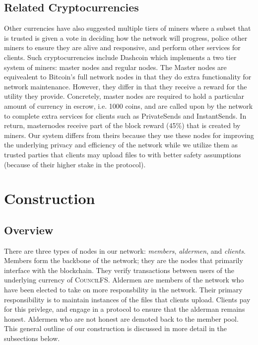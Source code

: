 \documentclass{article}
\begin{document}
\subsection{Related Cryptocurrencies}
Other currencies have also suggested multiple tiers of miners where a subset that is trusted is given a vote in deciding how the network will progress, police other miners to ensure they are alive and responsive, and perform other services for clients. Such cryptocurrencies include Dashcoin which implements a two tier system of miners: master nodes and regular nodes. The Master nodes are equivealent to Bitcoin's full network nodes in that they do extra functionality for network maintenance. However, they differ in that they receive a reward for the utility they provide. Concretely, master nodes are required to hold a particular amount of currency in escrow, i.e. 1000 coins, and are called upon by the network to complete extra services for clients such as PrivateSends and InstantSends. In return, masternodes receive part of the block reward (45\%) that is created by miners. Our system differs from theirs because they use these nodes for improving the underlying privacy and efficiency of the network while we utilize them as trusted parties that clients may upload files to with better safety assumptions (because of their higher stake in the protocol).   

\section{Construction}

\subsection{Overview}

There are three types of nodes in our network: \emph{members}, \emph{aldermen},
and \emph{clients}. Members form the backbone of the network; they are the nodes
that primarily interface with the blockchain. They verify transactions between
users of the underlying currency of \textsc{CouncilFS}. Aldermen are members of the
network who have been elected to take on more responsbility in the network.
Their primary responsibility is to maintain instances of the files that clients
upload. Clients pay for this privlege, and engage in a protocol to ensure that
the alderman remains honest. Aldermen who are not honest are demoted back to the
member pool. This general outline of our construction is discussed in more
detail in the subsections below.
\end{document}
